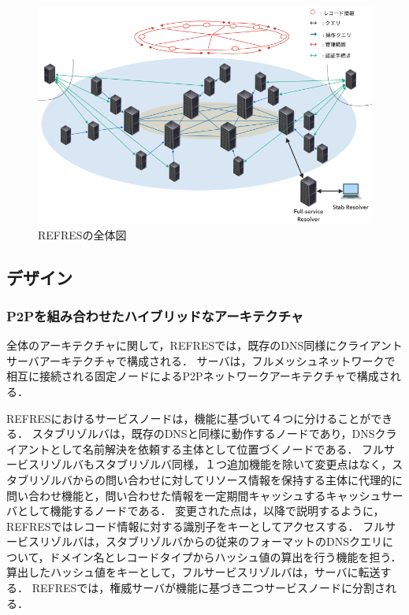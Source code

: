 \begin{figure}[t]
 \centering
 \label{fig:abstruct-REFRES-architecture}
 \includegraphics[scale=0.5]{figure/abstruct-architecture.png}
 \caption{REFRESの全体図}
\end{figure}


\subsection{デザイン}
\subsubsection{P2Pを組み合わせたハイブリッドなアーキテクチャ}
全体のアーキテクチャに関して，REFRESでは，既存のDNS同様にクライアントサーバアーキテクチャで構成される．
サーバは，フルメッシュネットワークで相互に接続される固定ノードによるP2Pネットワークアーキテクチャで構成される．


REFRESにおけるサービスノードは，機能に基づいて４つに分けることができる．
スタブリゾルバは，既存のDNSと同様に動作するノードであり，DNSクライアントとして名前解決を依頼する主体として位置づくノードである．
フルサービスリゾルバもスタブリゾルバ同様，１つ追加機能を除いて変更点はなく，スタブリゾルバからの問い合わせに対してリソース情報を保持する主体に代理的に問い合わせ機能と，問い合わせた情報を一定期間キャッシュするキャッシュサーバとして機能するノードである．
変更された点は，以降で説明するように，REFRESではレコード情報に対する識別子をキーとしてアクセスする．
フルサービスリゾルバは，スタブリゾルバからの従来のフォーマットのDNSクエリについて，ドメイン名とレコードタイプからハッシュ値の算出を行う機能を担う．
算出したハッシュ値をキーとして，フルサービスリゾルバは，サーバに転送する．
REFRESでは，権威サーバが機能に基づき二つサービスノードに分割される．

